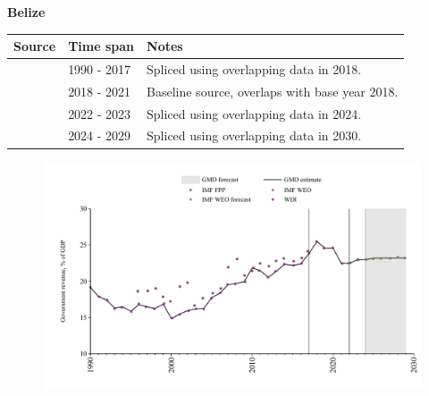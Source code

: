\documentclass[12pt,a4paper,landscape]{article}
\begin{document}
\begin{adjustbox}{max totalsize={\paperwidth}{\paperheight},center}
\begin{minipage}[t][\textheight][t]{\textwidth}
\vspace*{0.5cm}
{}
\begin{center}
{\Large\bfseries Belize}
\end{center}
\vspace{0.5cm}
\begin{table}[H]
\centering
\small
\begin{tabular}{|l|l|l|}
\hline
\textbf{Source} & \textbf{Time span} & \textbf{Notes} \\
\hline
\rowcolor{white}\cite{WDI}& 1990 - 2017 &Spliced using overlapping data in 2018.\\
\rowcolor{lightgray}\cite{IMF_WEO}& 2018 - 2021 &Baseline source, overlaps with base year 2018.\\
\rowcolor{white}\cite{IMF_FPP}& 2022 - 2023 &Spliced using overlapping data in 2024.\\
\rowcolor{lightgray}\cite{IMF_WEO_forecast}& 2024 - 2029 &Spliced using overlapping data in 2030.\\
\hline
\end{tabular}
\end{table}
\begin{figure}[H]
\centering
\includegraphics[width=\textwidth,height=0.6\textheight,keepaspectratio]{graphs/BLZ_govrev_GDP.pdf}
\end{figure}
\end{minipage}
\end{adjustbox}
\end{document}
